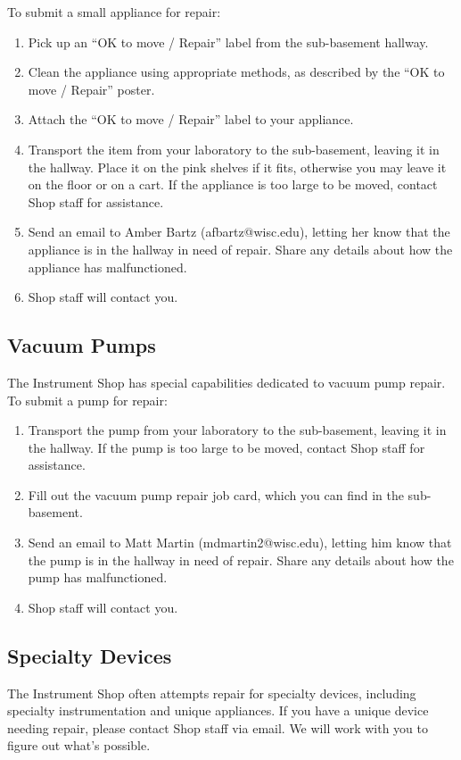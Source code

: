 \documentclass{training}
\begin{document}
To submit a small appliance for repair:

\begin{enumerate}
  \item Pick up an ``OK to move / Repair'' label from the sub-basement hallway.
  \item Clean the appliance using appropriate methods, as described by the ``OK to move / Repair'' poster.
  \item Attach the ``OK to move / Repair'' label to your appliance.
  \item Transport the item from your laboratory to the sub-basement, leaving it in the hallway. Place it on the pink shelves if it fits, otherwise you may leave it on the floor or on a cart. If the appliance is too large to be moved, contact Shop staff for assistance.
  \item Send an email to Amber Bartz  (afbartz@wisc.edu), letting her know that the appliance is in the hallway in need of repair. Share any details about how the appliance has malfunctioned.
  \item Shop staff will contact you.
\end{enumerate}

\subsection{Vacuum Pumps}

The Instrument Shop has special capabilities dedicated to vacuum pump repair.
To submit a pump for repair:

\begin{enumerate}
  \item Transport the pump from your laboratory to the sub-basement, leaving it in the hallway. If the pump is too large to be moved, contact Shop staff for assistance.
  \item Fill out the vacuum pump repair job card, which you can find in the sub-basement.
  \item Send an email to Matt Martin (mdmartin2@wisc.edu), letting him know that the pump is in the hallway in need of repair. Share any details about how the pump has malfunctioned.
  \item Shop staff will contact you.
\end{enumerate}

\subsection{Specialty Devices}

The Instrument Shop often attempts repair for specialty devices, including specialty instrumentation and unique appliances.
If you have a unique device needing repair, please contact Shop staff via email.
We will work with you to figure out what's possible.
\end{document}
